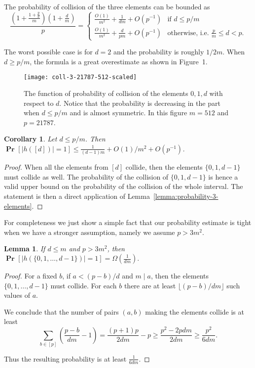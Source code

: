 \documentclass{article}
\newcommand{\probs}[2]{\operatorname{\mathbf{Pr}}_{{#1}}\left[{#2}\right]}
\newcommand{\prob}[1]{\probs{}{#1}}
\newtheorem{lemma}{Lemma}
\newtheorem{corollary}{Corollary}
\begin{document}
The probability of collision of the three elements can be bounded as
\[
\frac{\left(1 + \frac{1 + \frac{p}{d}}{m}\right)\left(1 + \frac{d}{m}\right)}{p} =
\begin{cases}
	\frac{O(1)}{m^2} + \frac{1}{dm} + O\left(p^{-1}\right) & \mbox{if } d \leq p/m \\
	\frac{O(1)}{m^2} + \frac{d}{pm} + O\left(p^{-1}\right) & \mbox{otherwise, i.e. } \frac{p}{m} \leq d < p.
\end{cases}
\]

The worst possible case is for $d = 2$ and the probability is roughly $1/2m$. 
When $d \geq p/m$, the formula is a great overestimate as shown in Figure~1.

\begin{figure}[h]
	\label{fig:probability-3}
	\centering
	\texttt{[image: coll-3-21787-512-scaled]}
	\caption{The function of probability of collision of the elements $0, 1, d$ with respect to $d$. Notice that the probability is decreasing in the part when $d \leq p / m$ and is almost symmetric. In this figure $m = 512$ and $p = 21787$.}
\end{figure}

\begin{corollary}
\label{co:d-elements}
Let $d \leq p / m$. Then $\prob{|h([d])| = 1} \leq \frac{1}{(d - 1) m} + O(1)/m^2 + O(p^{-1})$.
\end{corollary}
\begin{proof}
When all the elements from $[d]$ collide, then the elements $\{0, 1, d - 1\}$ must collide as well. The probability of the collision of $\{0, 1, d - 1\}$ is hence a valid upper bound on the probability of the collision of the whole interval. The statement is then a direct application of Lemma~\ref{lemma:probability-3-elements}.
\end{proof}

For completeness we just show a simple fact that our probability estimate is tight when we have a stronger assumption, namely we assume $p > 3m^2$.

\begin{lemma}
\label{lm:0-d-prob-lower-bound}
If $d \leq m$ and $p > 3m^2$, then $\prob{|h(\{0, 1, \ldots, d - 1\})| = 1} = \Omega\left(\frac{1}{dm}\right).$
\end{lemma}
\begin{proof}
For a fixed $b$, if $a < (p - b)/d$ and $m \mid a$, then the elements $\{0, 1, \ldots, d - 1\}$ must collide.
For each $b$ there are at least $\lfloor (p - b)/dm \rfloor$ such values of $a$.

We conclude that the number of pairs $(a, b)$ making the elements collide is at least
\[
\sum_{b \in [p]} \left(\frac{p - b}{dm} - 1\right) = \frac{(p + 1)p}{2dm} - p \geq \frac{p ^ 2 - 2pdm}{2dm} \geq \frac{p^2}{6dm}.
\]

Thus the resulting probability is at least $\frac{1}{6dm}$.
\end{proof}
\end{document}
